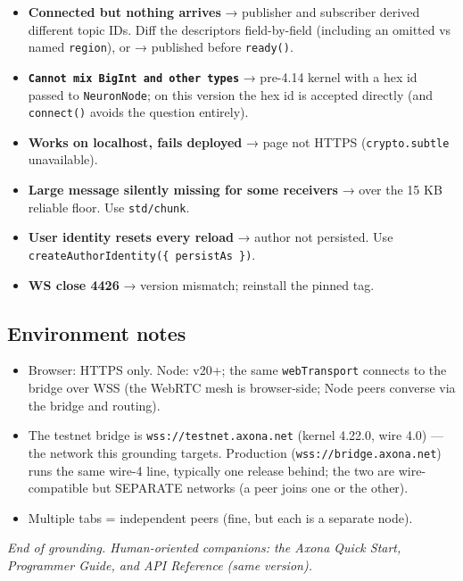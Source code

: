 \documentclass[
  nobib]{tufte-handout}
\providecommand{\tightlist}{%
  \setlength{\itemsep}{0pt}\setlength{\parskip}{0pt}}
\begin{document}
\begin{itemize}
\tightlist
\item
  \textbf{Connected but nothing arrives} → publisher and subscriber
  derived different topic IDs. Diff the descriptors field-by-field
  (including an omitted vs named \texttt{region}), or → published before
  \texttt{ready()}.
\item
  \textbf{\texttt{Cannot\ mix\ BigInt\ and\ other\ types}} → pre-4.14
  kernel with a hex id passed to \texttt{NeuronNode}; on this version
  the hex id is accepted directly (and \texttt{connect()} avoids the
  question entirely).
\item
  \textbf{Works on localhost, fails deployed} → page not HTTPS
  (\texttt{crypto.subtle} unavailable).
\item
  \textbf{Large message silently missing for some receivers} → over the
  15 KB reliable floor. Use \texttt{std/chunk}.
\item
  \textbf{User identity resets every reload} → author not persisted. Use
  \texttt{createAuthorIdentity(\{\ persistAs\ \})}.
\item
  \textbf{WS close 4426} → version mismatch; reinstall the pinned tag.
\end{itemize}

\subsection{Environment notes}\label{environment-notes}

\begin{itemize}
\tightlist
\item
  Browser: HTTPS only. Node: v20+; the same \texttt{webTransport}
  connects to the bridge over WSS (the WebRTC mesh is browser-side; Node
  peers converse via the bridge and routing).
\item
  The testnet bridge is \texttt{wss://testnet.axona.net} (kernel 4.22.0,
  wire 4.0) --- the network this grounding targets. Production
  (\texttt{wss://bridge.axona.net}) runs the same wire-4 line, typically
  one release behind; the two are wire-compatible but SEPARATE networks
  (a peer joins one or the other).
\item
  Multiple tabs = independent peers (fine, but each is a separate node).
\end{itemize}

\emph{End of grounding. Human-oriented companions: the Axona Quick
Start, Programmer Guide, and API Reference (same version).}
\end{document}
